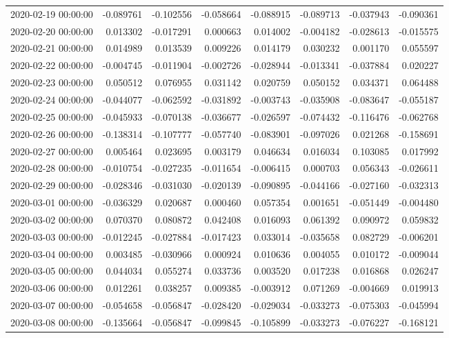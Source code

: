 \begin{tabular}{lrrrrrrr}
2020-02-19 00:00:00 & -0.089761 & -0.102556 & -0.058664 & -0.088915 & -0.089713 & -0.037943 & -0.090361 \\
2020-02-20 00:00:00 & 0.013302 & -0.017291 & 0.000663 & 0.014002 & -0.004182 & -0.028613 & -0.015575 \\
2020-02-21 00:00:00 & 0.014989 & 0.013539 & 0.009226 & 0.014179 & 0.030232 & 0.001170 & 0.055597 \\
2020-02-22 00:00:00 & -0.004745 & -0.011904 & -0.002726 & -0.028944 & -0.013341 & -0.037884 & 0.020227 \\
2020-02-23 00:00:00 & 0.050512 & 0.076955 & 0.031142 & 0.020759 & 0.050152 & 0.034371 & 0.064488 \\
2020-02-24 00:00:00 & -0.044077 & -0.062592 & -0.031892 & -0.003743 & -0.035908 & -0.083647 & -0.055187 \\
2020-02-25 00:00:00 & -0.045933 & -0.070138 & -0.036677 & -0.026597 & -0.074432 & -0.116476 & -0.062768 \\
2020-02-26 00:00:00 & -0.138314 & -0.107777 & -0.057740 & -0.083901 & -0.097026 & 0.021268 & -0.158691 \\
2020-02-27 00:00:00 & 0.005464 & 0.023695 & 0.003179 & 0.046634 & 0.016034 & 0.103085 & 0.017992 \\
2020-02-28 00:00:00 & -0.010754 & -0.027235 & -0.011654 & -0.006415 & 0.000703 & 0.056343 & -0.026611 \\
2020-02-29 00:00:00 & -0.028346 & -0.031030 & -0.020139 & -0.090895 & -0.044166 & -0.027160 & -0.032313 \\
2020-03-01 00:00:00 & -0.036329 & 0.020687 & 0.000460 & 0.057354 & 0.001651 & -0.051449 & -0.004480 \\
2020-03-02 00:00:00 & 0.070370 & 0.080872 & 0.042408 & 0.016093 & 0.061392 & 0.090972 & 0.059832 \\
2020-03-03 00:00:00 & -0.012245 & -0.027884 & -0.017423 & 0.033014 & -0.035658 & 0.082729 & -0.006201 \\
2020-03-04 00:00:00 & 0.003485 & -0.030966 & 0.000924 & 0.010636 & 0.004055 & 0.010172 & -0.009044 \\
2020-03-05 00:00:00 & 0.044034 & 0.055274 & 0.033736 & 0.003520 & 0.017238 & 0.016868 & 0.026247 \\
2020-03-06 00:00:00 & 0.012261 & 0.038257 & 0.009385 & -0.003912 & 0.071269 & -0.004669 & 0.019913 \\
2020-03-07 00:00:00 & -0.054658 & -0.056847 & -0.028420 & -0.029034 & -0.033273 & -0.075303 & -0.045994 \\
2020-03-08 00:00:00 & -0.135664 & -0.056847 & -0.099845 & -0.105899 & -0.033273 & -0.076227 & -0.168121 \\

\end{tabular}
